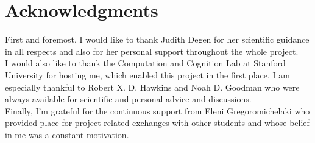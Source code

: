 \documentclass[a4paper,man,floatsintext,natbib,donotrepeattitle]{apa6}
\begin{document}

\section{Acknowledgments}

First and foremost, I would like to thank Judith Degen for her scientific guidance in all respects and also for her personal support throughout the whole project. \\
I would also like to thank the Computation and Cognition Lab at Stanford University for hosting me, which enabled this project in the first place. I am especially thankful to Robert X. D. Hawkins and Noah D. Goodman who were always available for scientific and personal advice and discussions.\\
Finally, I'm grateful for the continuous support from Eleni Gregoromichelaki who provided place for project-related exchanges with other students and whose belief in me was a constant motivation.



\vfill
\pagebreak
\end{document}
